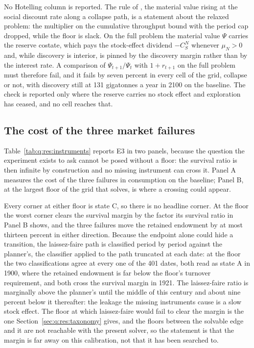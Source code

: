 No Hotelling column is reported. The rule of , the material value rising at the social discount rate along a collapse path, is a statement about the relaxed problem: the multiplier on the cumulative throughput bound with the period cap dropped, while the floor is slack. On the full problem the material value $\Psi$ carries the reserve costate, which pays the stock-effect dividend $-C^N_S$ whenever $\mu_N>0$ and, while discovery is interior, is pinned by the discovery margin rather than by the interest rate. A comparison of $\Psi_{t+1}/\Psi_t$ with $1+r_{t+1}$ on the full problem must therefore fail, and it fails by seven percent in every cell of the grid, collapse or not, with discovery still at 131 gigatonnes a year in 2100 on the baseline. The check is reported only where the reserve carries no stock effect and exploration has ceased, and no cell reaches that.

\subsection{The cost of the three market failures}\label{sec:q:res:instruments}

Table~\ref{tab:q:res:instruments} reports E3 in two panels, because the question the experiment exists to ask cannot be posed without a floor: the survival ratio is then infinite by construction and no missing instrument can cross it. Panel A measures the cost of the three failures in consumption on the baseline; Panel B, at the largest floor of the grid that solves, is where a crossing could appear.



 Every corner at either floor is state C, so there is no headline corner. At the floor the worst corner clears the survival margin by the factor its survival ratio in Panel B shows, and the three failures move the retained endowment by at most thirteen percent in either direction. Because the endpoint alone could hide a transition, the laissez-faire path is classified period by period against the planner's, the classifier applied to the path truncated at each date: at the floor the two classifications agree at every one of the 401 dates, both read as state A in 1900, where the retained endowment is far below the floor's turnover requirement, and both cross the survival margin in 1921. The laissez-faire ratio is marginally above the planner's until the middle of this century and about nine percent below it thereafter: the leakage the missing instruments cause is a slow stock effect. The floor at which laissez-faire would fail to clear the margin is the one Section~\ref{sec:q:res:taxonomy} gives, and the floors between the solvable edge and it are not reachable with the present solver, so the statement is that the margin is far away on this calibration, not that it has been searched to.

